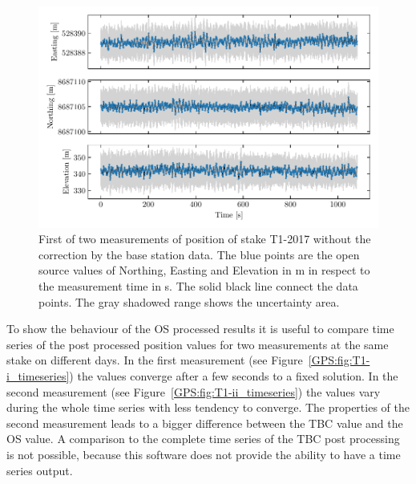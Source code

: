 \begin{figure}[h]
    \centering
    \includegraphics[width=.9\textwidth]{./figs/timeseries/46250700_org-T1-i-2017_Timeseries-east-north-elev.pdf}
    \caption{First of two measurements of position of stake T1-2017 without the correction by the base station data. The blue points are the open source values of Northing, Easting and Elevation in m in respect to the measurement time in s. The solid black line connect the data points. The gray shadowed range shows the uncertainty area.}
    \label{GPS:fig:T1-i_nocorr}
\end{figure}

To show the behaviour of the OS processed results it is useful to compare time series of the post processed position values for two measurements at the same stake on different days.
In the first measurement (see Figure~\ref{GPS:fig:T1-i_timeseries}) the values converge after a few seconds to a fixed solution.
In the second measurement (see Figure~\ref{GPS:fig:T1-ii_timeseries}) the values vary during the whole time series with less tendency to converge.
The properties of the second measurement leads to a bigger difference between the TBC value and the OS value.
A comparison to the complete time series of the TBC post processing is not possible, because this software does not provide the ability to have a time series output.

